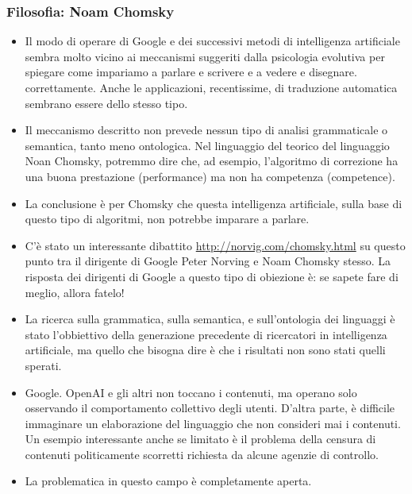\documentclass[xcolor=svgnames]{beamer}
\begin{document}
\begin{frame}\small\frametitle{Filosofia: Noam Chomsky}

\begin{itemize}
    \item Il modo di operare di Google e dei successivi metodi di intelligenza artificiale sembra molto vicino ai meccanismi suggeriti dalla psicologia evolutiva per spiegare come impariamo a parlare e scrivere e a vedere e disegnare.  correttamente. Anche le applicazioni, recentissime, di traduzione automatica sembrano essere dello stesso tipo.
    
\item Il meccanismo descritto non prevede nessun tipo di analisi grammaticale o semantica, tanto meno ontologica. Nel linguaggio del teorico del linguaggio Noan Chomsky, potremmo dire che, ad esempio, l'algoritmo di correzione ha una buona prestazione (performance) ma non ha competenza (competence).

\item La conclusione è per Chomsky che questa intelligenza artificiale, sulla base di questo tipo di algoritmi, non potrebbe imparare a parlare. 

\item C'è stato un interessante dibattito \url{http://norvig.com/chomsky.html} su questo punto tra il dirigente di Google Peter Norving e Noam Chomsky stesso. La risposta dei dirigenti di Google a questo tipo di obiezione è: se sapete fare di meglio, allora fatelo!

\item La ricerca sulla grammatica, sulla semantica, e sull'ontologia dei linguaggi è stato l'obbiettivo della generazione precedente di ricercatori in intelligenza artificiale, ma quello che bisogna dire è che i risultati non sono stati quelli sperati.

\item Google. OpenAI e gli altri  non toccano i contenuti, ma operano solo osservando il comportamento collettivo degli utenti. D'altra parte, è difficile immaginare un elaborazione del linguaggio che non consideri mai i contenuti. Un esempio interessante anche se limitato è il problema della censura di contenuti politicamente scorretti  richiesta da alcune agenzie di controllo.

\item La problematica in questo campo è completamente aperta.

\end{itemize}
\end{frame}
\end{document}
